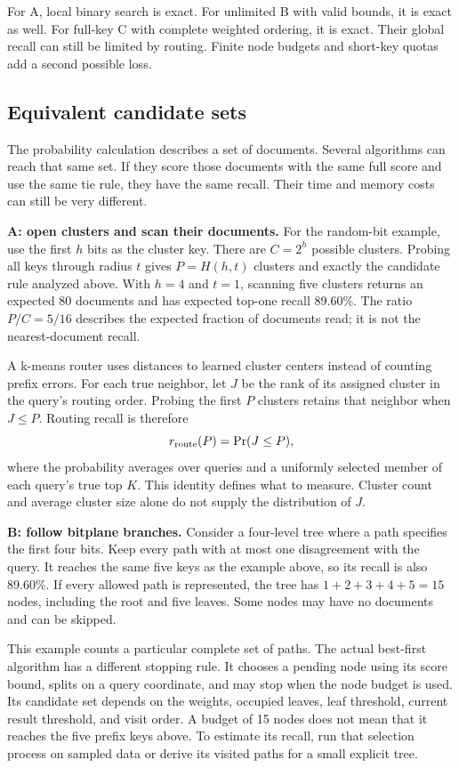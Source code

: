 For A, local binary search is exact. For unlimited B with valid bounds, it is exact as well.
For full-key C with complete weighted ordering, it is exact. Their global recall can still
be limited by routing. Finite node budgets and short-key quotas add a second possible loss.

\subsection{Equivalent candidate sets}
The probability calculation describes a set of documents. Several algorithms can reach that
same set. If they score those documents with the same full score and use the same tie rule,
they have the same recall. Their time and memory costs can still be very different.

\textbf{A: open clusters and scan their documents.} For the random-bit example, use the first
$h$ bits as the cluster key. There are $C=2^h$ possible clusters. Probing all keys through
radius $t$ gives $P=H(h,t)$ clusters and exactly the candidate rule analyzed above. With
$h=4$ and $t=1$, scanning five clusters returns an expected 80 documents and has expected
top-one recall 89.60\%. The ratio $P/C=5/16$ describes the expected fraction of documents read;
it is not the nearest-document recall.

A k-means router uses distances to learned cluster centers instead of counting prefix errors. For
each true neighbor, let $J$ be the rank of its assigned cluster in the query's routing order.
Probing the first $P$ clusters retains that neighbor when $J\le P$. Routing recall is therefore
\[
r_{\rm route}(P)=\Pr(J\le P),
\]
where the probability averages over queries and a uniformly selected member of each query's
true top $K$. This identity defines what to measure. Cluster count and average cluster size
alone do not supply the distribution of $J$.

\textbf{B: follow bitplane branches.} Consider a four-level tree where a path specifies the
first four bits. Keep every path with at most one disagreement with the query. It reaches the
same five keys as the example above, so its recall is also 89.60\%. If every allowed path is
represented, the tree has $1+2+3+4+5=15$ nodes, including the root and five leaves. Some nodes
may have no documents and can be skipped.

This example counts a particular complete set of paths. The actual best-first algorithm has
a different stopping rule. It chooses a pending node using its score bound, splits on a query
coordinate, and may stop when the node budget is used. Its candidate set depends on the weights,
occupied leaves, leaf threshold, current result threshold, and visit order. A budget of 15
nodes does not mean that it reaches the five prefix keys above. To estimate its recall, run
that selection process on sampled data or derive its visited paths for a small explicit tree.


